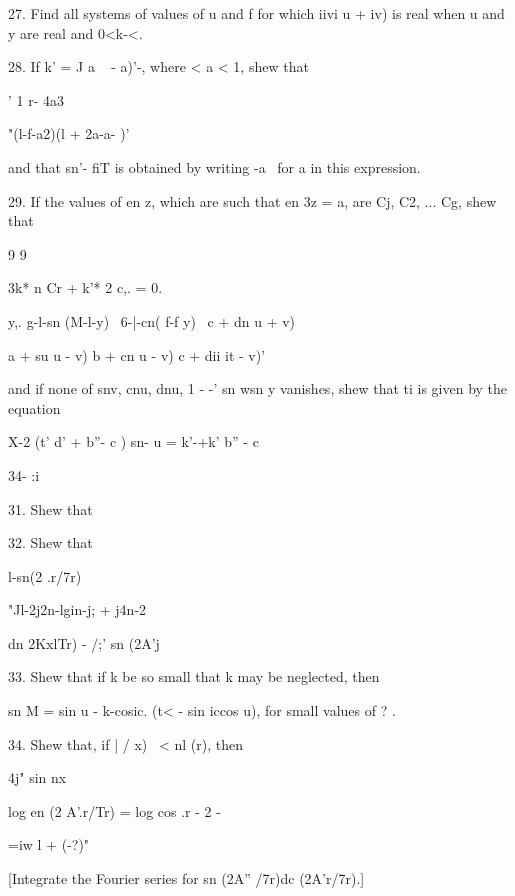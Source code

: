 27. Find all systems of values of u and f for which iivi u + iv) is
real when u and y are real and 0<k-<. 

28. If k' = J a ~ - a)'-, where < a < 1, shew that

' 1 r- 4a3

 "(l-f-a2)(l + 2a-a- )'

and that sn'- fiT is obtained by writing -a~ for a in this expression.


29. If the values of en z, which are such that en 3z = a, are Cj, C2,
... Cg, shew that

9 9

3k* n Cr + k'* 2 c,. = 0.


y,. g-l-sn (M-l-y) \ 6-|-cn( f-f y) \ c + dn u + v)

a + su u - v) b + cn u - v) c + dii it - v)'

and if none of snv, cnu, dnu, 1 - -' sn wsn y vanishes, shew that ti
is given by the equation

X-2 (t' d' + b''- c ) sn- u = k'-+k' b'' - c\


34- :i

%
%

31. Shew that


32. Shew that

l-sn(2 .r/7r)

"Jl-2j2n-lgin-j; + j4n-2

 dn 2KxlTr) - /;' sn (2A'j


33. Shew that if k be so small that k may be neglected, then

sn M = sin u - k-cosic. (t< - sin iccos u), for small values of ? .

34. Shew that, if | / x) \ < nl (r), then

4j" sin nx

log en (2 A'.r/Tr) = log cos .r - 2 -

 =iw l + (-?)"

 [Integrate the Fourier series for sn (2A'' /7r)dc
(2A'r/7r).]

